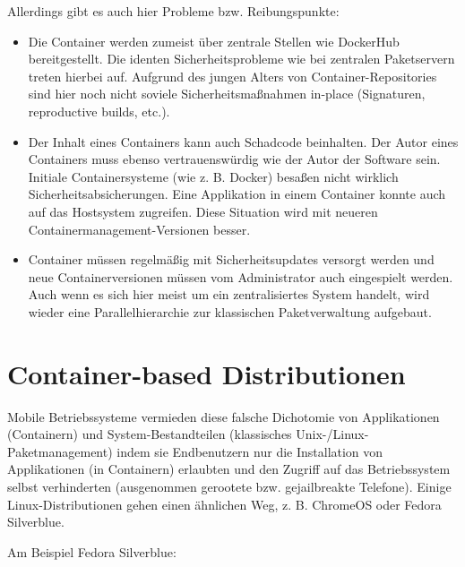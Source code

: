 Allerdings gibt es auch hier Probleme bzw. Reibungspunkte:

\begin{itemize}
	\item Die Container werden zumeist über zentrale Stellen wie DockerHub bereitgestellt. Die identen Sicherheitsprobleme wie bei zentralen Paketservern treten hierbei auf. Aufgrund des jungen Alters von Container-Repositories sind hier noch nicht soviele Sicherheitsmaßnahmen in-place (Signaturen, reproductive builds, etc.).
	\item Der Inhalt eines Containers kann auch Schadcode beinhalten. Der Autor eines Containers muss ebenso vertrauenswürdig wie der Autor der Software sein. Initiale Containersysteme (wie z. B. Docker) besaßen nicht wirklich Sicherheitsabsicherungen. Eine Applikation in einem Container konnte auch auf das Hostsystem zugreifen. Diese Situation wird mit neueren Containermanagement-Versionen besser.
	\item Container müssen regelmäßig mit Sicherheitsupdates versorgt werden und neue Containerversionen müssen vom Administrator auch eingespielt werden. Auch wenn es sich hier meist um ein zentralisiertes System handelt, wird wieder eine Parallelhierarchie zur klassischen Paketverwaltung aufgebaut.
\end{itemize}

\section{Container-based Distributionen}

Mobile Betriebssysteme vermieden diese falsche Dichotomie von Applikationen (Containern) und System-Bestandteilen (klassisches Unix-/Linux-Paketmanagement) indem sie Endbenutzern nur die Installation von Applikationen (in Containern) erlaubten und den Zugriff auf das Betriebssystem selbst verhinderten (ausgenommen gerootete bzw. gejailbreakte Telefone). Einige Linux-Distributionen gehen einen ähnlichen Weg, z. B. ChromeOS oder Fedora Silverblue.

Am Beispiel Fedora Silverblue:

